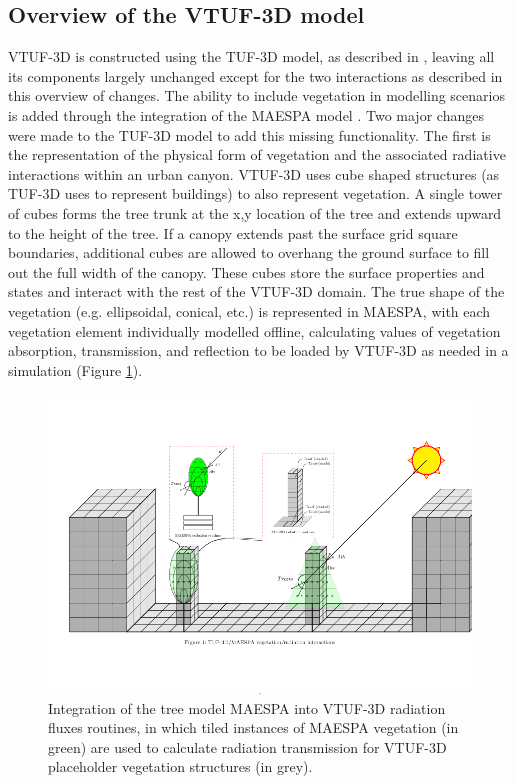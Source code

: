 \documentclass[final,3p,times,authoryear]{elsarticle}
\begin{document}
\subsection{Overview of the VTUF-3D model}\label{sec:DesignOverview}

VTUF-3D is constructed using the TUF-3D model, as described in \cite{Krayenhoff2007}, leaving all its components largely unchanged except for the two interactions as described in this overview of changes. The ability to include vegetation in modelling scenarios is added through the integration of the MAESPA model \citep{Duursma2012}. Two major changes were made to the TUF-3D model to add this missing functionality. The first is the representation of the physical form of vegetation and the associated radiative interactions within an urban canyon. VTUF-3D uses cube shaped structures (as TUF-3D uses to represent buildings) to also represent vegetation. A single tower of cubes forms the tree trunk at the x,y location of the tree and extends upward to the height of the tree. If a canopy extends past the surface grid square boundaries, additional cubes are allowed to overhang the ground surface to fill out the full width of the canopy. These cubes store the surface properties and states and interact with the rest of the VTUF-3D domain. The true shape of the vegetation (e.g. ellipsoidal, conical, etc.) is represented in MAESPA, with each vegetation element individually modelled offline, calculating values of vegetation absorption, transmission, and reflection to be loaded by VTUF-3D as needed in a simulation (Figure \ref{fig:TUFWithMaespaVegRadiation}).


\begin{figure}[!htbp]
 \includegraphics[trim = 15mm 41mm 0mm 31mm, clip, scale=0.45]{images/TUFWithMaespaVegRadiation.png}  
 \caption{Integration of the tree model MAESPA into VTUF-3D radiation fluxes routines, in which tiled instances of MAESPA vegetation (in green) are used to calculate radiation transmission for VTUF-3D placeholder vegetation structures (in grey)\label{fig:TUFWithMaespaVegRadiation}.}
\end{figure}
\end{document}
